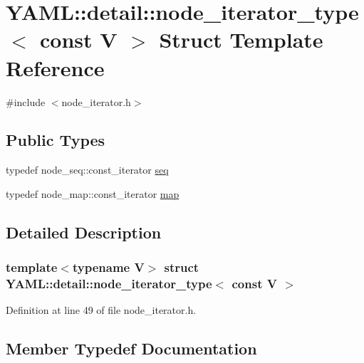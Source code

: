 \hypertarget{struct_y_a_m_l_1_1detail_1_1node__iterator__type_3_01const_01_v_01_4}{}\section{Y\+A\+ML\+::detail\+::node\+\_\+iterator\+\_\+type$<$ const V $>$ Struct Template Reference}
\label{struct_y_a_m_l_1_1detail_1_1node__iterator__type_3_01const_01_v_01_4}


{\ttfamily \#include $<$node\+\_\+iterator.\+h$>$}

\subsection*{Public Types}
\begin{DoxyCompactItemize}
\item 
typedef node\+\_\+seq\+::const\+\_\+iterator \mbox{\hyperlink{struct_y_a_m_l_1_1detail_1_1node__iterator__type_3_01const_01_v_01_4_a84aeeaf64232c552dcfca2ffd68e99d4}{seq}}
\item 
typedef node\+\_\+map\+::const\+\_\+iterator \mbox{\hyperlink{struct_y_a_m_l_1_1detail_1_1node__iterator__type_3_01const_01_v_01_4_ad48a4ae14361f5cfd81010f1dc004c40}{map}}
\end{DoxyCompactItemize}


\subsection{Detailed Description}
\subsubsection*{template$<$typename V$>$\newline
struct Y\+A\+M\+L\+::detail\+::node\+\_\+iterator\+\_\+type$<$ const V $>$}



Definition at line 49 of file node\+\_\+iterator.\+h.



\subsection{Member Typedef Documentation}
\mbox{\label{struct_y_a_m_l_1_1detail_1_1node__iterator__type_3_01const_01_v_01_4_ad48a4ae14361f5cfd81010f1dc004c40}} 

